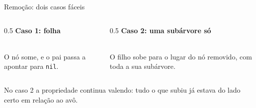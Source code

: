 \documentclass{beamer}
\begin{document}
\begin{frame}{Remoção: dois casos fáceis}
  \begin{columns}[t]
    \begin{column}{0.5\textwidth}
      \centering
      \textbf{Caso 1: folha}\\[0.2cm]
      \\[0.2cm]
      O nó some, e o pai passa a apontar para \texttt{nil}.
    \end{column}
    \begin{column}{0.5\textwidth}
      \centering
      \textbf{Caso 2: uma subárvore só}\\[0.2cm]
      \\[0.2cm]
      O filho sobe para o lugar do nó removido, com toda a sua subárvore.
    \end{column}
  \end{columns}

  \vspace{0.4cm}
  No caso 2 a propriedade continua valendo: tudo o que subiu já estava do lado
  certo em relação ao avô.
\end{frame}
\end{document}
